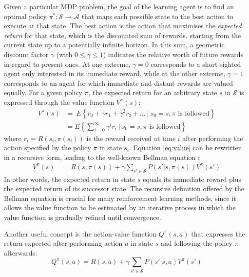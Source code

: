 Given a particular MDP problem, the goal of the learning agent is to find an optimal policy $\pi^*: \mathcal{S} \rightarrow \mathcal{A}$ that maps each possible state to the best action to execute at that state.  The best action is the action that maximises the \textit{expected return} for that state, which is the discounted sum of rewards, starting from the current state up to a potentially infinite horizon.  In this sum, a geometric discount factor $\gamma$ (with $0 \leq \gamma \leq 1$) indicates the relative worth of future rewards in regard to present ones. At one extreme, $\gamma = 0$ corresponds to a short-sighted agent only interested in its immediate reward, while at the other extreme, $\gamma=1$ corresponds to an agent for which immediate and distant rewards are valued equally. For a given policy $\pi$, the expected return for an arbitrary state $s$ in $\mathcal{S}$ is expressed through the value function $V^{\pi}(s)$:
\begin{align}
V^{\pi}(s) & = \  E \left\{ r_0 + \gamma r_1 + \gamma^2 r_2 + \dots \ \big| \ s_0 = s, \pi \text{ is followed} \right\} \\
& = E \left\{\sum_{i=0}^{\infty}  \gamma^i r_{i} \ \bigg| \ s_0 = s, \pi \text{ is followed} \right\} \label{eq:value}
\end{align} 
where $r_i = R(s_i, \pi(s_i))$ is the reward received at time $i$ after performing the action specified by the policy $\pi$  in state $s_i$.  Equation \eqref{eq:value}  can be rewritten in a recursive form, leading to the well-known Bellman equation \citep{Bellman:1957}:
\begin{align}
V^{\pi}(s) & = \    R(s, \pi(s)) + \gamma  \sum_{s' \in \mathcal{S}} P(s'|s,\pi(s)) V^{\pi}(s') \label{eq:bellman}
\end{align} 
In other words, the expected return in state $s$ equals its immediate reward plus the expected return of its successor state.  The recursive definition offered by the Bellman equation is crucial for many reinforcement learning methods, since it allows the value function to be estimated by an iterative process in which the value function is gradually refined until convergence.

Another useful concept is the action-value function $Q^{\pi}(s,a)$ that expresses the return expected after performing action $a$ in state $s$ and following the policy $\pi$ afterwards:
\begin{equation}
Q^{\pi}(s,a) = R(s,a) + \gamma  \sum_{s' \in \mathcal{S}} P(s'|s,a) V^{\pi}(s')
\end{equation}

